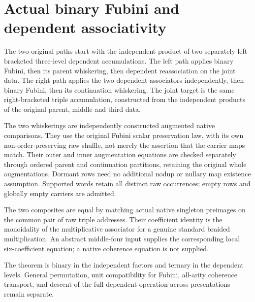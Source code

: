 \documentclass{article}
\begin{document}
\section*{Actual binary Fubini and dependent associativity}
The two original paths start with the independent product of
two separately left-bracketed three-level dependent accumulations.
The left path applies binary Fubini, then its parent whiskering,
then dependent reassociation on the joint data. The right path
applies the two dependent associators independently, then binary
Fubini, then its continuation whiskering. The joint target is the
same right-bracketed triple accumulation, constructed from the
independent products of the original parent, middle and third data.

The two whiskerings are independently constructed augmented native
comparisons. They use the original Fubini scalar preservation law,
with its own non-order-preserving raw shuffle, not merely the
assertion that the carrier maps match. Their outer and inner
augmentation equations are checked separately through ordered
parent and continuation partitions, retaining the original whole
augmentations. Dormant rows need no additional nodup or nullary
map existence assumption. Supported words retain all distinct raw
occurrences; empty rows and globally empty carriers are admitted.

The two composites are equal by matching actual native singleton
preimages on the common pair of raw triple addresses. Their
coefficient identity is the monoidality of the multiplicative
associator for a genuine standard braided multiplication. An
abstract middle-four input supplies the corresponding local
six-coefficient equation; a native coherence equation is not supplied.

The theorem is binary in the independent factors and ternary in the
dependent levels. General permutation, unit compatibility for
Fubini, all-arity coherence transport, and descent of the full
dependent operation across presentations remain separate.
\end{document}
